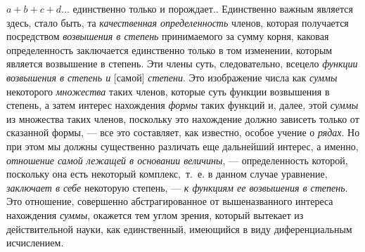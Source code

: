 {{$ a + b + c + d \dots $ единственно только и порождает.}. Единственно
важным является здесь, стало быть, та {\em качественная
определенность} членов, которая получается посредством
{\em возвышения в степень} принимаемого за сумму корня,
каковая определенность заключается единственно только в том изменении,
которым является возвышение в степень. Эти члены суть, следовательно,
всецело {\em функции возвышения в степень и} [самой]
{\em степени}. Это изображение числа как
{\em суммы} некоторого
{\em множества} таких членов, которые суть функции
возвышения в степень, а затем интерес нахождения
{\em формы} таких функций и, далее, этой
{\em суммы} из множества таких членов, поскольку это
нахождение должно зависеть только от сказанной формы, — все это составляет,
как известно, особое учение о {\em рядах}. Но при этом
мы должны существенно различать еще дальнейший интерес, а именно,
{\em отношение самой лежащей в основании величины}, —
определенность которой, поскольку она есть некоторый комплекс,~т.~е. в
данном случае уравнение, {\em заключает в себе}
некоторую степень, — {\em к функциям ее возвышения в
степень}. Это отношение, совершенно абстрагированное от вышеназванного
интереса нахождения {\em суммы}, окажется тем углом
зрения, который вытекает из действительной науки, как единственный,
имеющийся в виду диференциальным исчислением.

}
